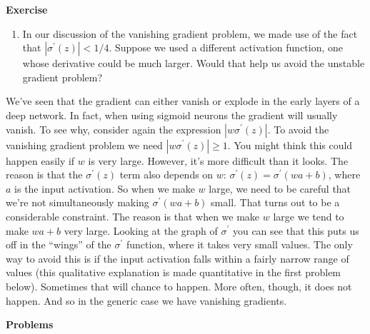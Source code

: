 \textbf{Exercise}


\begin{enumerate}
    \item In our discussion of the vanishing gradient problem, we made use of the fact that $\left|\sigma^{\prime}(z)\right|<1 / 4$. Suppose we used a different activation function, one whose derivative could be much larger. Would that help us avoid the unstable gradient problem? 
    
\end{enumerate}

 We've seen that the gradient can either vanish or explode in the early layers of a deep network. In fact, when using sigmoid neurons the gradient will usually vanish. To see why, consider again the expression $\left|w \sigma^{\prime}(z)\right|$. To avoid the vanishing gradient problem we need $\left|w \sigma^{\prime}(z)\right| \geq 1$. You might think this could happen easily if $w$ is very large. However, it's more difficult than it looks. The reason is that the $\sigma^{\prime}(z)$ term also depends on $w$:
$\sigma^{\prime}(z)=\sigma^{\prime}(w a+b)$, where $a$ is the input activation. So when we make $w$ large, we need to be careful that we're not simultaneously making $\sigma^{\prime}(w a+b)$ small. That turns out to be a considerable constraint. The reason is that when we make $w$ large we tend to make $wa+b$ very large. Looking at the graph of $\sigma^\prime$ you can see that this puts us off in the ``wings'' of the $\sigma^\prime$ function, where it takes very small values. The only way to avoid this is if the input activation falls within a fairly narrow range of values (this qualitative explanation is made quantitative in the first problem below). Sometimes that will chance to happen. More often, though, it does not happen. And so in the generic case we have vanishing gradients.

\textbf{Problems}


